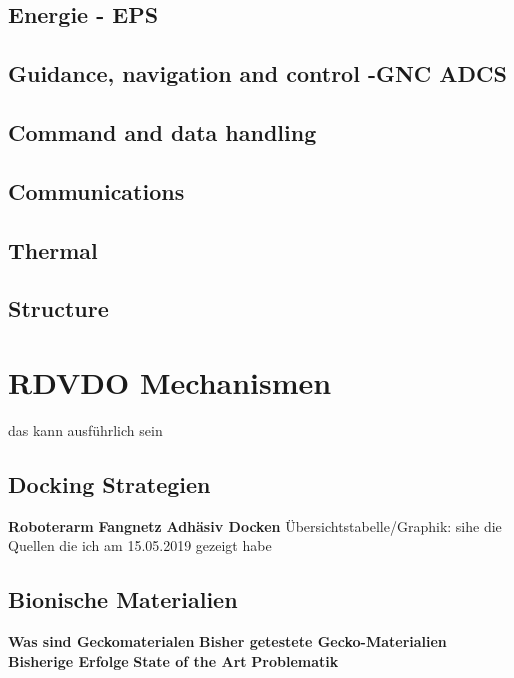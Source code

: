 		\subsection{Energie - EPS}
		\subsection{Guidance, navigation and control -GNC ADCS}
		\subsection{Command and data handling}
		\subsection{Communications}
		\subsection{Thermal}
		\subsection{Structure}
				
	\section{RDVDO Mechanismen} das kann ausführlich sein
		\subsection{Docking Strategien}
						\textbf{Roboterarm}
						\textbf{Fangnetz}
						\textbf{Adhäsiv Docken}
						Übersichtstabelle/Graphik: sihe die Quellen die ich am 15.05.2019 gezeigt habe
		\subsection{Bionische Materialien}
						\textbf{Was sind Geckomaterialen}
						\textbf{Bisher getestete Gecko-Materialien}
						\textbf{Bisherige Erfolge}
						\textbf{State of the Art}
						\textbf{Problematik}